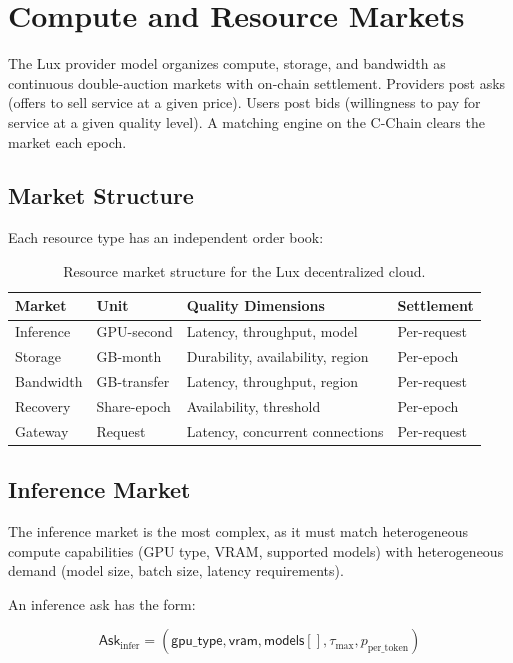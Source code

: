 \section{Compute and Resource Markets}
\label{sec:markets}

The Lux provider model organizes compute, storage, and bandwidth as
continuous double-auction markets with on-chain settlement. Providers
post asks (offers to sell service at a given price). Users post bids
(willingness to pay for service at a given quality level). A matching
engine on the C-Chain clears the market each epoch.

\subsection{Market Structure}

Each resource type has an independent order book:

\begin{table}[H]
\centering
\caption{Resource market structure for the Lux decentralized cloud.}
\label{tab:markets}
\begin{tabular}{llll}
\toprule
\textbf{Market} & \textbf{Unit} & \textbf{Quality Dimensions} & \textbf{Settlement} \\
\midrule
Inference & GPU-second & Latency, throughput, model & Per-request \\
Storage & GB-month & Durability, availability, region & Per-epoch \\
Bandwidth & GB-transfer & Latency, throughput, region & Per-request \\
Recovery & Share-epoch & Availability, threshold & Per-epoch \\
Gateway & Request & Latency, concurrent connections & Per-request \\
\bottomrule
\end{tabular}
\end{table}

\subsection{Inference Market}

The inference market is the most complex, as it must match heterogeneous
compute capabilities (GPU type, VRAM, supported models) with heterogeneous
demand (model size, batch size, latency requirements).

An inference ask has the form:

\begin{equation}
    \mathsf{Ask}_{\text{infer}} = (\mathsf{gpu\_type}, \mathsf{vram}, \mathsf{models}[], \tau_{\max}, p_{\text{per\_token}})
\end{equation}

